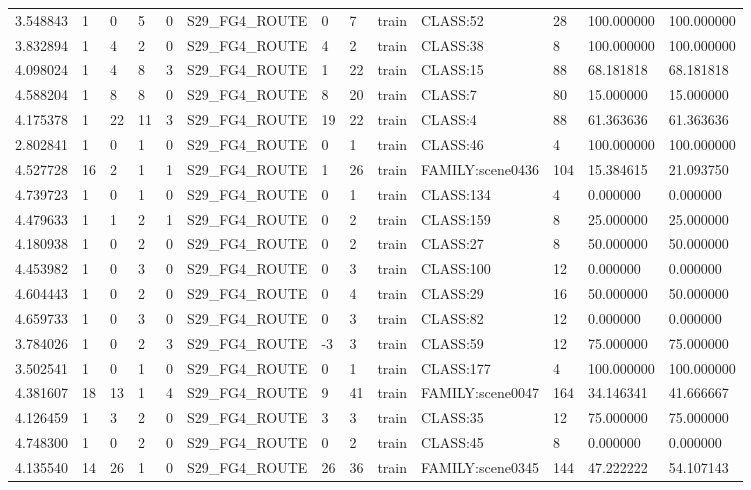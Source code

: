 \begin{tabular}{lllllllllllll}
3.548843 & 1 & 0 & 5 & 0 & S29\_FG4\_ROUTE & 0 & 7 & train & CLASS:52 & 28 & 100.000000 & 100.000000 \\
3.832894 & 1 & 4 & 2 & 0 & S29\_FG4\_ROUTE & 4 & 2 & train & CLASS:38 & 8 & 100.000000 & 100.000000 \\
4.098024 & 1 & 4 & 8 & 3 & S29\_FG4\_ROUTE & 1 & 22 & train & CLASS:15 & 88 & 68.181818 & 68.181818 \\
4.588204 & 1 & 8 & 8 & 0 & S29\_FG4\_ROUTE & 8 & 20 & train & CLASS:7 & 80 & 15.000000 & 15.000000 \\
4.175378 & 1 & 22 & 11 & 3 & S29\_FG4\_ROUTE & 19 & 22 & train & CLASS:4 & 88 & 61.363636 & 61.363636 \\
2.802841 & 1 & 0 & 1 & 0 & S29\_FG4\_ROUTE & 0 & 1 & train & CLASS:46 & 4 & 100.000000 & 100.000000 \\
4.527728 & 16 & 2 & 1 & 1 & S29\_FG4\_ROUTE & 1 & 26 & train & FAMILY:scene0436 & 104 & 15.384615 & 21.093750 \\
4.739723 & 1 & 0 & 1 & 0 & S29\_FG4\_ROUTE & 0 & 1 & train & CLASS:134 & 4 & 0.000000 & 0.000000 \\
4.479633 & 1 & 1 & 2 & 1 & S29\_FG4\_ROUTE & 0 & 2 & train & CLASS:159 & 8 & 25.000000 & 25.000000 \\
4.180938 & 1 & 0 & 2 & 0 & S29\_FG4\_ROUTE & 0 & 2 & train & CLASS:27 & 8 & 50.000000 & 50.000000 \\
4.453982 & 1 & 0 & 3 & 0 & S29\_FG4\_ROUTE & 0 & 3 & train & CLASS:100 & 12 & 0.000000 & 0.000000 \\
4.604443 & 1 & 0 & 2 & 0 & S29\_FG4\_ROUTE & 0 & 4 & train & CLASS:29 & 16 & 50.000000 & 50.000000 \\
4.659733 & 1 & 0 & 3 & 0 & S29\_FG4\_ROUTE & 0 & 3 & train & CLASS:82 & 12 & 0.000000 & 0.000000 \\
3.784026 & 1 & 0 & 2 & 3 & S29\_FG4\_ROUTE & -3 & 3 & train & CLASS:59 & 12 & 75.000000 & 75.000000 \\
3.502541 & 1 & 0 & 1 & 0 & S29\_FG4\_ROUTE & 0 & 1 & train & CLASS:177 & 4 & 100.000000 & 100.000000 \\
4.381607 & 18 & 13 & 1 & 4 & S29\_FG4\_ROUTE & 9 & 41 & train & FAMILY:scene0047 & 164 & 34.146341 & 41.666667 \\
4.126459 & 1 & 3 & 2 & 0 & S29\_FG4\_ROUTE & 3 & 3 & train & CLASS:35 & 12 & 75.000000 & 75.000000 \\
4.748300 & 1 & 0 & 2 & 0 & S29\_FG4\_ROUTE & 0 & 2 & train & CLASS:45 & 8 & 0.000000 & 0.000000 \\
4.135540 & 14 & 26 & 1 & 0 & S29\_FG4\_ROUTE & 26 & 36 & train & FAMILY:scene0345 & 144 & 47.222222 & 54.107143 \\

\end{tabular}
